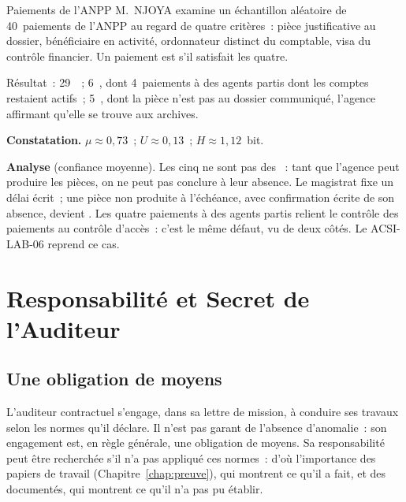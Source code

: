 \begin{boxlecture}{Paiements de l'ANPP}
M.~NJOYA examine un échantillon aléatoire de 40~paiements de l'ANPP au
regard de quatre critères~: pièce justificative au dossier, bénéficiaire
en activité, ordonnateur distinct du comptable, visa du contrôle
financier. Un paiement est \OUI{} s'il satisfait les quatre.

\medskip
Résultat~: 29~\OUI{}~; 6~\NON{}, dont 4~paiements à des agents partis
dont les comptes restaient actifs~; 5~\NEK{}, dont la pièce n'est pas au
dossier communiqué, l'agence affirmant qu'elle se trouve aux archives.

\medskip
\textbf{Constatation.} $\mu \approx 0{,}73$~; $U \approx 0{,}13$~;
$H \approx 1{,}12$~bit.

\medskip
\textbf{Analyse} (confiance moyenne). Les cinq \NEK{} ne sont pas des
\NON{}~: tant que l'agence peut produire les pièces, on ne peut pas
conclure à leur absence. Le magistrat fixe un délai écrit~; une pièce non
produite à l'échéance, avec confirmation écrite de son absence, devient
\NON{}. Les quatre paiements à des agents partis relient le contrôle des
paiements au contrôle d'accès~: c'est le même défaut, vu de deux côtés. Le
ACSI-LAB-06 reprend ce cas.

\medskip
\hfill{}
\end{boxlecture}

\section{Responsabilité et Secret de l'Auditeur}
\label{sec:c12-responsabilite}

\subsection{Une obligation de moyens}

L'auditeur contractuel s'engage, dans sa lettre de mission, à conduire ses
travaux selon les normes qu'il déclare. Il n'est pas garant de l'absence
d'anomalie~: son engagement est, en règle générale, une obligation de
moyens. Sa responsabilité peut être recherchée s'il n'a pas appliqué ces
normes~: d'où l'importance des papiers de travail
(Chapitre~\ref{chap:preuve}), qui montrent ce qu'il a fait, et des \NEK{}
documentés, qui montrent ce qu'il n'a pas pu établir.

